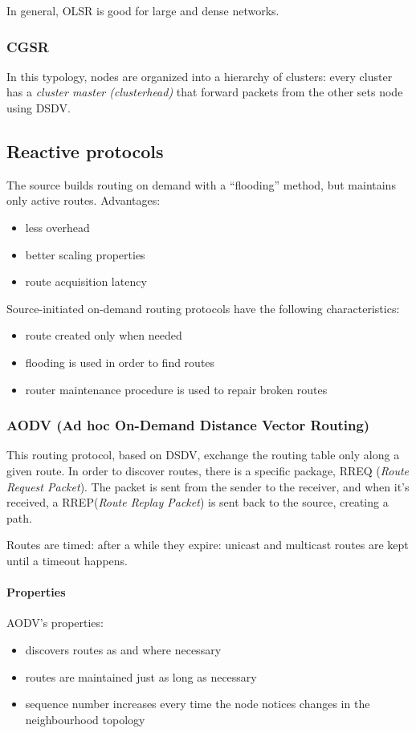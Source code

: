 In general, OLSR is good for large and dense networks.

\subsubsection{CGSR}

In this typology, nodes are organized into a hierarchy of clusters: every
cluster has a \textit{cluster master (clusterhead)} that forward packets from
the other sets node using DSDV.

\subsection{Reactive protocols}
The source builds routing on demand with a ``flooding'' method, but maintains
only active routes.
Advantages:
\begin{itemize}
\item less overhead
\item better scaling properties
\item route acquisition latency
\end{itemize}

Source-initiated on-demand routing protocols have the following characteristics:
\begin{itemize}
\item route created only when needed
\item flooding is used in order to find routes
\item router maintenance procedure is used to repair broken routes
\end{itemize}

\subsubsection{AODV (Ad hoc On-Demand Distance Vector Routing)}

This routing protocol, based on DSDV, exchange the routing table only along a
given route. In order to discover routes, there is a specific package, RREQ
(\textit{Route Request Packet}). The packet is sent from the sender to the
receiver, and when it's received, a RREP(\textit{Route Replay Packet}) is sent
back to the source, creating a path.

Routes are timed: after a while they expire: unicast and multicast routes are
kept until a timeout happens.

\paragraph*{Properties} AODV's properties:
\begin{itemize}
\item discovers routes as and where necessary
\item routes are maintained just as long as necessary
\item sequence number increases every time the node notices changes in the neighbourhood topology
\end{itemize}

